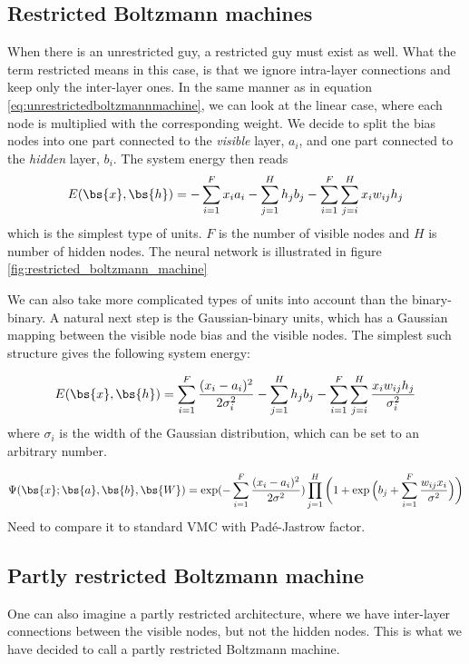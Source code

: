 \subsection{Restricted Boltzmann machines}
When there is an unrestricted guy, a restricted guy must exist as well. What the term restricted means in this case, is that we ignore intra-layer connections and keep only the inter-layer ones. In the same manner as in equation \eqref{eq:unrestrictedboltzmannmachine}, we can look at the linear case, where each node is multiplied with the corresponding weight. We decide to split the bias nodes into one part connected to the \textit{visible} layer, $a_i$, and one part connected to the \textit{hidden} layer, $b_i$. The system energy then reads
\begin{equation}
E(\bs{x},\bs{h})=- \sum_{i=1}^Fx_ia_i- \sum_{j=1}^Hh_jb_j-\sum_{i=1}^F\sum_{j=i}^H x_iw_{ij}h_j 
\label{eq:binarybinary}
\end{equation}
which is the simplest type of units. $F$ is the number of visible nodes and $H$ is number of hidden nodes. The neural network is illustrated in figure \eqref{fig:restricted_boltzmann_machine}



We can also take more complicated types of units into account than the binary-binary. A natural next step is the Gaussian-binary units, which has a Gaussian mapping between the visible node bias and the visible nodes. The simplest such structure gives the following system energy:

\begin{equation}
E(\bs{x},\bs{h})= \sum_{i=1}^F\frac{(x_i-a_i)^2}{2\sigma_i^2} - \sum_{j=1}^Hh_jb_j-\sum_{i=1}^F\sum_{j=i}^H \frac{x_iw_{ij}h_j}{\sigma_i^2} 
\label{eq:gaussianbinary}
\end{equation}
where $\sigma_i$ is the width of the Gaussian distribution, which can be set to an arbitrary number. 

\begin{equation}
\Psi(\bs{x};\bs{a},\bs{b},\bs{W})=\exp(-\sum_{i=1}^F\frac{(x_i-a_i)^2}{2\sigma^2})\prod_{j=1}^H\bigg(1+\exp\Big(b_j+\sum_{i=1}^F\frac{w_{ij}x_i}{\sigma^2}\Big)\bigg)
\label{eq:NQSWF}
\end{equation}
Need to compare it to standard VMC with Padé-Jastrow factor. 

\subsection{Partly restricted Boltzmann machine}
One can also imagine a partly restricted architecture, where we have inter-layer connections between the visible nodes, but not the hidden nodes. This is what we have decided to call a partly restricted Boltzmann machine. 

